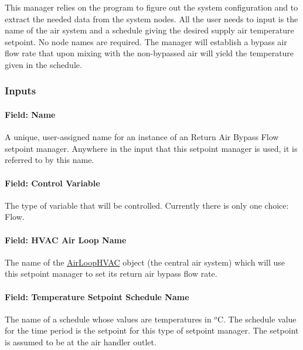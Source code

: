 This manager relies on the program to figure out the system configuration and to extract the needed data from the system nodes. All the user needs to input is the name of the air system and a schedule giving the desired supply air temperature setpoint. No node names are required. The manager will establish a bypass air flow rate that upon mixing with the non-bypassed air will yield the temperature given in the schedule.

\subsubsection{Inputs}\label{inputs-12-016}

\paragraph{Field: Name}\label{field-name-12-010}

A unique, user-assigned name for an instance of an Return Air Bypass Flow setpoint manager. Anywhere in the input that this setpoint manager is used, it is referred to by this name.

\paragraph{Field: Control Variable}\label{field-control-variable-12}

The type of variable that will be controlled. Currently there is only one choice: Flow.

\paragraph{Field: HVAC Air Loop Name}\label{field-hvac-air-loop-name-2}

The name of the \hyperref[airloophvac]{AirLoopHVAC} object (the central air system) which will use this setpoint manager to set its return air bypass flow rate.

\paragraph{Field: Temperature Setpoint Schedule Name}\label{field-temperature-setpoint-schedule-name}

The name of a schedule whose values are temperatures in \(^{o}\)C. The schedule value for the time period is the setpoint for this type of setpoint manager. The setpoint is assumed to be at the air handler outlet.

